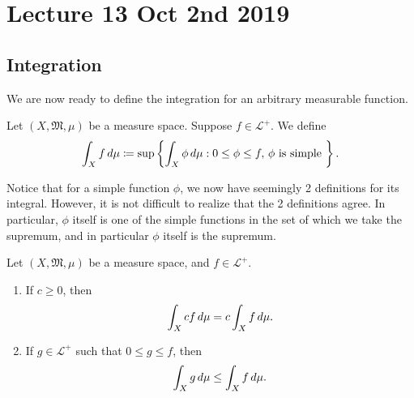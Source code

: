 \documentclass[notoc,notitlepage]{tufte-book}
\begin{document}


\chapter{Lecture 13 Oct 2nd 2019}%
\label{chp:lecture_13_oct_2nd_2019}

\section{Integration}%
\label{sec:integration}

We are now ready to define the integration for an arbitrary measurable function.

\begin{defn}\label{defn:integral_of_a_measurable_function}
  Let $(X, \mathfrak{M}, \mu)$ be a measure space.
  Suppose $f \in \mathcal{L}^+$.
  We define
  \begin{equation*}
    \int_{X} f \mathop{}\!d{\mu} \coloneqq \sup \left\{ \int_{X} \phi \mathop{}\!d{\mu}
                      : 0 \leq \phi \leq f,\, \phi \text{ is simple } \right\}.
  \end{equation*}
\end{defn}

\begin{remark}
  Notice that for a simple function $\phi$,
  we now have seemingly 2 definitions for its integral.
  However, it is not difficult to realize that the 2 definitions agree.
  In particular, $\phi$ itself is one of the simple functions
  in the set of which we take the supremum,
  and in particular $\phi$ itself is the supremum.
\end{remark}

\begin{propo}\label{propo:properties_of_the_integral_of_measurable_functions}
  Let $(X, \mathfrak{M}, \mu)$ be a measure space, and $f \in \mathcal{L}^+$.
  \begin{enumerate}
    \item If $c \geq 0$, then
      \begin{equation*}
        \int_{X} cf \mathop{}\!d{\mu} = c \int_{X} f \mathop{}\!d{\mu}.
      \end{equation*}
    \item If $g \in \mathcal{L}^+$ such that $0 \leq g \leq f$, then
      \begin{equation*}
        \int_{X} g \mathop{}\!d{\mu} \leq \int_{X} f \mathop{}\!d{\mu}.
      \end{equation*}
  \end{enumerate}
\end{propo}
\end{document}
